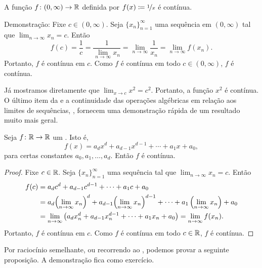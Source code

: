 \begin{example}
A função $f \colon (0,\infty) \to {\mathbb{R}}$
definida por $f(x) \coloneqq \nicefrac{1}{x}$ é contínua.

Demonstração: Fixe $c \in (0,\infty)$.
Seja $\{ x_n \}_{n=1}^\infty$ uma sequência em $(0,\infty)$ tal que
$\lim_{n\to\infty} x_n = c$. Então
\begin{equation*}
f(c) = \frac{1}{c}
=
\frac{1}{\lim_{n\to\infty} x_n}
=
\lim_{n \to \infty} \frac{1}{x_n}
=
\lim_{n \to \infty} f(x_n) .
\end{equation*}
Portanto, $f$ é contínua em $c$. Como $f$ é contínua em todo $c \in
(0,\infty)$, $f$ é contínua.
\end{example}

Já mostramos diretamente que $\lim_{x \to c} x^2 = c^2$. Portanto,
a função $x^2$ é contínua. O último item da  e a continuidade das
operações algébricas em relação aos limites de sequências,
, fornecem uma demonstração rápida de um resultado muito mais geral.

\begin{prop}
Seja $f \colon {\mathbb{R}} \to {\mathbb{R}}$ um \emph{}. Isto é,
\begin{equation*}
f(x) = a_d x^d + a_{d-1} x^{d-1} + \cdots + a_1 x + a_0 ,
\end{equation*}
para certas constantes $a_0, a_1, \ldots, a_d$.
Então $f$ é contínua.
\end{prop}

\begin{proof}
Fixe $c \in {\mathbb{R}}$.
Seja $\{ x_n \}_{n=1}^\infty$ uma sequência tal que
$\lim_{n\to\infty} x_n = c$. Então
\begin{equation*}
\begin{split}
f(c) &=
a_d c^d + a_{d-1} c^{d-1} + \cdots + a_1 c + a_0 
\\
&= 
a_d {\left(\lim_{n\to\infty} x_n\right)}^d
+ a_{d-1} {\left(\lim_{n\to\infty} x_n\right)}^{d-1}
+ \cdots
+ a_1 \left(\lim_{n\to\infty} x_n\right) + a_0 
\\
& =
\lim_{n \to \infty}
\left(
a_d x_n^d + a_{d-1} x_n^{d-1} + \cdots + a_1 x_n + a_0 
\right)
=
\lim_{n \to \infty}
f(x_n) .
\avoidbreak
\end{split}
\end{equation*}
Portanto, $f$ é contínua em $c$. Como $f$ é contínua em todo $c \in {\mathbb{R}}$,
$f$ é contínua.
\end{proof}

Por raciocínio semelhante, ou recorrendo ao ,
podemos provar a seguinte proposição. A demonstração fica como exercício.

